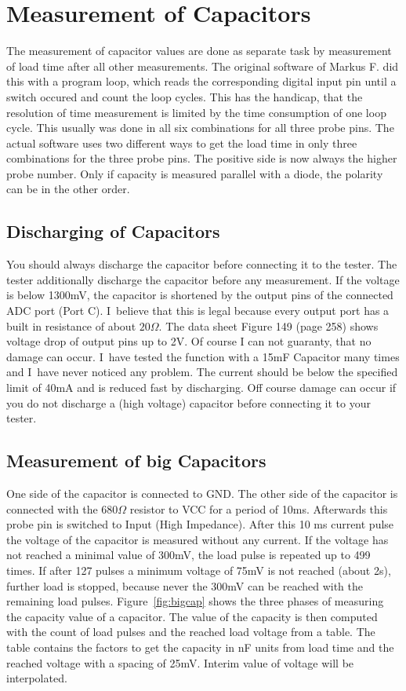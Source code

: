 \section{Measurement of Capacitors}
The measurement of capacitor values are done as separate task by measurement of load time
after all other measurements. 
The original software of Markus F. did this with a program loop, which reads the corresponding digital input
pin until a switch occured and count the loop cycles.
This has the handicap, that the resolution of time measurement is limited by the
time consumption of one loop cycle.
This usually was done in all six combinations for all three probe pins. 
The actual software uses two different ways to get the load time in only
three combinations for the three probe pins. The positive side is now always the
higher probe number. Only if capacity is measured parallel with a diode, the
polarity can be in the other order.

\subsection{Discharging of Capacitors}
You should always discharge the capacitor before connecting it to the tester.
The tester additionally discharge the capacitor before any measurement.
If the voltage is below 1300mV, the capacitor is shortened by the output pins of the connected ADC port (Port C).
I~believe that this is legal because every output port has a built in resistance of about \(20\Omega\).
The data sheet Figure 149 (page 258) \cite{ATmega8} shows voltage drop of output pins up to 2V.
Of course I can not guaranty, that no damage can occur. 
I~have tested the function with a 15mF Capacitor many times and I~have never noticed any problem.
The current should be below the specified limit of 40mA and is reduced fast by discharging.
Off course damage can occur if you do not discharge a (high voltage) capacitor before connecting it to your tester.

\subsection{Measurement of big Capacitors}
\label{sec:bigcap}
One side of the capacitor is connected to GND. The other side of the capacitor is connected with the
\(680\Omega\) resistor to VCC for a period of 10ms. Afterwards this probe pin is switched to Input (High Impedance).
After this 10 ms current pulse the voltage of the capacitor is measured without any current. If the voltage has not
reached a minimal value of 300mV, the load pulse is repeated up to 499 times.
If after 127 pulses a minimum voltage of 75mV is not reached (about 2s), further load is stopped, because never
the 300mV can be reached with the remaining load pulses.
Figure~\ref{fig:bigcap} shows the three phases of measuring the capacity value of a capacitor.
The value of the capacity is then computed with the count of load pulses and the reached load voltage from a table.
The table contains  the factors to get the capacity in nF units from load time and the reached voltage
with a spacing of 25mV.
Interim value of voltage will be interpolated.

